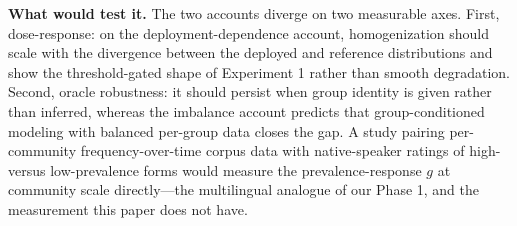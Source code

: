 ﻿\documentclass[11pt]{article}
\begin{document}
\textbf{What would test it.} The two accounts diverge on two measurable axes. First, dose-response: on the deployment-dependence account, homogenization should scale with the divergence between the deployed and reference distributions and show the threshold-gated shape of Experiment 1 rather than smooth degradation. Second, oracle robustness: it should persist when group identity is given rather than inferred, whereas the imbalance account predicts that group-conditioned modeling with balanced per-group data closes the gap. A study pairing per-community frequency-over-time corpus data with native-speaker ratings of high- versus low-prevalence forms would measure the prevalence-response \(g\) at community scale directly---the multilingual analogue of our Phase 1, and the measurement this paper does not have.
\end{document}
